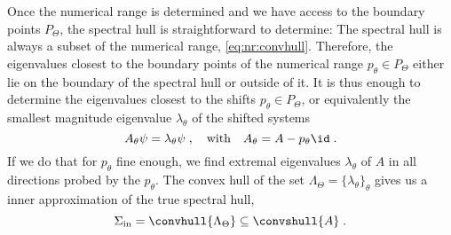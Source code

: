 Once the numerical range is determined and we have access to the boundary points $P_{\Theta}$, the spectral hull is straightforward to determine:
The spectral hull is always a subset of the numerical range, \cref{eq:nr:convhull}.
Therefore, the eigenvalues closest to the boundary points of the numerical range $p_{\theta} \in P_{\Theta}$ either lie on the boundary of the spectral hull or outside of it.
It is thus enough to determine the eigenvalues closest to the shifts $p_{\theta} \in P_{\Theta}$, or equivalently the smallest magnitude eigenvalue $\lambda_{\theta}$ of the shifted systems
\begin{equation}
A_{\theta} \psi = \lambda_{\theta} \psi \;,
\quad
\text{with}
\quad
A_{\theta} = A - p_{\theta} \id \;.
\end{equation}
If we do that for $p_{\theta}$ fine enough, we find extremal eigenvalues $\lambda_{\theta}$ of $A$ in all directions probed by the $p_{\theta}$.
The convex hull of the set $\Lambda_{\Theta} = \{ \lambda_{\theta} \}_{\theta}$ gives us a inner approximation of the true spectral hull,
\begin{equation}
\Sigma_{\text{in}} = \convhull{ \Lambda_{\Theta} } \subseteq \convshull{A} \;.
\end{equation}

